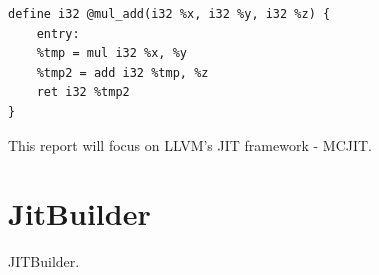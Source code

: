 \begin{lstlisting}[float,floatplacement=H,
caption={LLVM IR for a function multiplying x * y and adding z \cite{LLVM_Jit_Tutorial}},
label=lst:llvm_ir]
define i32 @mul_add(i32 %x, i32 %y, i32 %z) {
    entry:
    %tmp = mul i32 %x, %y
    %tmp2 = add i32 %tmp, %z
    ret i32 %tmp2
}\end{lstlisting}

This report will focus on LLVM's JIT framework - MCJIT.


\section{JitBuilder}
\label{sec:jitbuilder}
JITBuilder.
